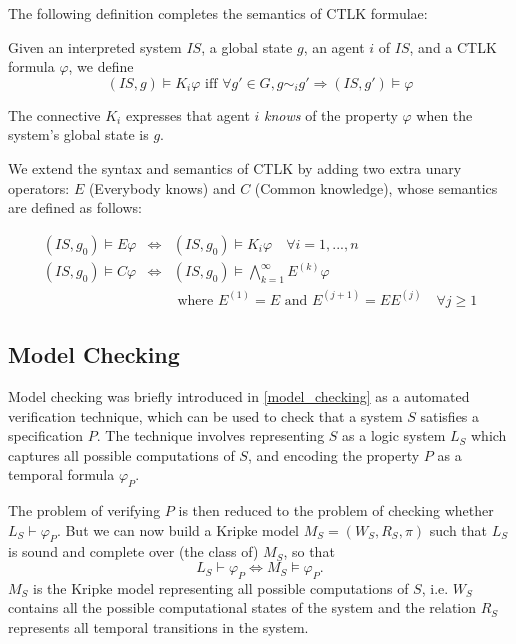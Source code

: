 \documentclass[12]{article}
\newenvironment{definition}[1][Definition]{\begin{trivlist}
\item[\hskip \labelsep {\bfseries #1}]}{\end{trivlist}}
\begin{document}
The following definition completes the semantics of CTLK formulae:

\begin{definition}
Given an interpreted system $IS$, a global state $g$, an agent $i$ of $IS$, and a CTLK formula $\varphi$, we define
$$(IS, g) \models K_i \varphi \mbox{  iff  } \forall g' \in G, g \sim_i g' \Rightarrow (IS, g') \models \varphi$$

The connective $K_i$ expresses that agent $i$ \emph{knows} of the property $\varphi$ when the system's global state is $g$.

We extend the syntax and semantics of CTLK by adding two extra unary operators: $E$ (Everybody knows) and $C$ (Common knowledge), whose semantics are defined as follows:

\begin{eqnarray*}
(IS, g_0) \models E\varphi &\Leftrightarrow& (IS, g_0) \models K_i \varphi \quad \forall i = 1, ..., n \\
(IS, g_0) \models C\varphi &\Leftrightarrow&  (IS, g_0) \models \bigwedge^\infty_{k = 1} E^{(k)}\varphi \quad \\&& \mbox{ where } E^{(1)} = E \mbox{ and } E^{(j+1)} = EE^{(j)} \quad \forall j \geq 1
\end{eqnarray*}
\end{definition}


\subsection{Model Checking}

Model checking was briefly introduced in \ref{model_checking} as a automated verification technique, which can be used to check that a system $S$ satisfies a specification $P$. The technique involves representing $S$ as a logic system $L_S$ which captures all possible computations of $S$, and encoding the property $P$ as a temporal formula $\varphi_P$. 

The problem of verifying $P$ is then reduced to the problem of checking whether $L_S \vdash \varphi_P $. But we can now build a Kripke model $M_S = (W_S, R_S, \pi)$ such that $L_S$ is sound and complete over (the class of) $M_S$, so that $$L_S \vdash \varphi_P \Leftrightarrow M_S \models \varphi_P .$$ 
$M_S$ is the Kripke model representing all possible computations of $S$, i.e. $W_S$ contains all the possible computational states of the system and the relation $R_S$ represents all temporal transitions in the system. 
\end{document}
